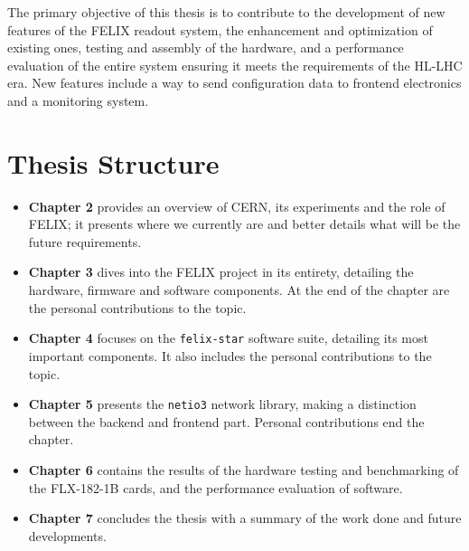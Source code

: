 The primary objective of this thesis is to contribute to the development of new features of the \acs{FELIX} readout system, the enhancement and optimization of existing ones, testing and assembly of the hardware, and a performance evaluation of the entire system ensuring it meets the requirements of the \acs{HL-LHC} era.
New features include a way to send configuration data to frontend electronics and a monitoring system.

\section{Thesis Structure}

\begin{itemize}
    \item \textbf{Chapter 2} provides an overview of \acs{CERN}, its experiments and the role of \acs{FELIX}; it presents where we currently are and better details what will be the future requirements.
    
    \item \textbf{Chapter 3} dives into the \acs{FELIX} project in its entirety, detailing the hardware, firmware and software components. At the end of the chapter are the personal contributions to the topic.
    
    \item \textbf{Chapter 4} focuses on the \texttt{felix-star} software suite, detailing its most important components. It also includes the personal contributions to the topic.
    
    \item \textbf{Chapter 5} presents the \texttt{netio3} network library, making a distinction between the backend and frontend part. Personal contributions end the chapter.
    
    \item \textbf{Chapter 6} contains the results of the hardware testing and benchmarking of the FLX-182-1B cards, and the performance evaluation of software.
    
    \item \textbf{Chapter 7} concludes the thesis with a summary of the work done and future developments.
\end{itemize}